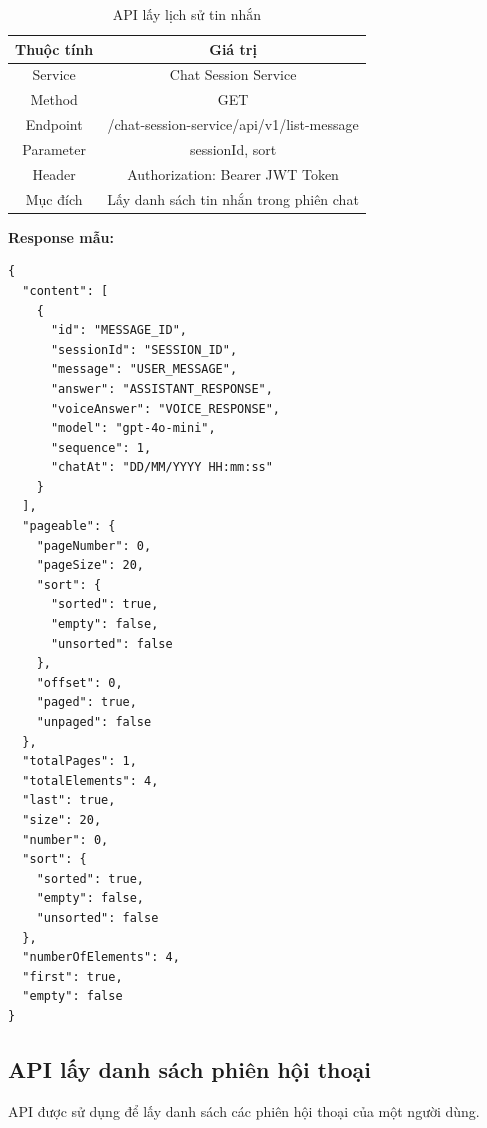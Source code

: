 \documentclass[../DoAn.tex]{subfiles}
\begin{document}
\begin{table}[H]
    \centering
    \renewcommand{\arraystretch}{1.8}
    \begin{tabular}{|c|c|}
        \hline
        \textbf{Thuộc tính} & \textbf{Giá trị}                          \\
        \hline
        Service             & Chat Session Service                      \\
        \hline
        Method              & GET                                       \\
        \hline
        Endpoint            & /chat-session-service/api/v1/list-message \\
        \hline
        Parameter           & sessionId, sort                           \\
        \hline
        Header              & Authorization: Bearer JWT Token           \\
        \hline
        Mục đích            & Lấy danh sách tin nhắn trong phiên chat   \\
        \hline
    \end{tabular}
    \caption{API lấy lịch sử tin nhắn}
\end{table}


\textbf{Response mẫu:}
\begin{verbatim}
{
  "content": [
    {
      "id": "MESSAGE_ID",
      "sessionId": "SESSION_ID",
      "message": "USER_MESSAGE",
      "answer": "ASSISTANT_RESPONSE",
      "voiceAnswer": "VOICE_RESPONSE",
      "model": "gpt-4o-mini",
      "sequence": 1,
      "chatAt": "DD/MM/YYYY HH:mm:ss"
    }
  ],
  "pageable": {
    "pageNumber": 0,
    "pageSize": 20,
    "sort": {
      "sorted": true,
      "empty": false,
      "unsorted": false
    },
    "offset": 0,
    "paged": true,
    "unpaged": false
  },
  "totalPages": 1,
  "totalElements": 4,
  "last": true,
  "size": 20,
  "number": 0,
  "sort": {
    "sorted": true,
    "empty": false,
    "unsorted": false
  },
  "numberOfElements": 4,
  "first": true,
  "empty": false
}
\end{verbatim}
\clearpage

\subsection{API lấy danh sách phiên hội thoại}
API được sử dụng để lấy danh sách các phiên hội thoại của một người dùng.
\end{document}
